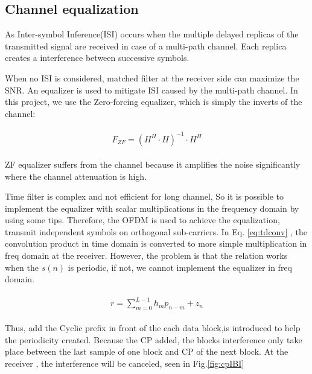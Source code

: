 \documentclass[a4paper]{article}
\begin{document}
	
	\subsection{Channel equalization}
	
	As Inter-symbol Inference(ISI) occurs when the multiple delayed replicas of the transmitted signal are received in case of a multi-path channel. Each replica creates a interference between successive symbols. 
	
	When no ISI is considered, matched filter at the receiver side can maximize the SNR. An equalizer is used to mitigate ISI caused by the multi-path channel. In this project, we use the Zero-forcing equalizer, which is simply the inverts of the channel:
	
	\begin{align} 
		\begin{split}
			F_{ZF} = (H^H \cdot H) ^{-1} \cdot H^H
		\end{split}
		\label{eq:ZF}
	\end{align}
	
	ZF equalizer suffers from the channel because it amplifies the noise significantly where the channel attenuation is high. 
    
  Time filter is complex and not efficient for long channel, So it is possible to implement the equalizer with scalar multiplications in the frequency domain by using some tips.
Therefore, the OFDM is used to achieve the equalization, transmit independent symbols on orthogonal sub-carriers. In Eq. \ref{eq:tdconv} , the convolution product in time domain is converted to more simple multiplication in freq domain at the receiver. However, the problem is that the relation works when the $s(n)$ is periodic, if not, we cannot implement the equalizer in freq domain.

\begin{align} 
		\begin{split}
			r = \sum_{m=0}^{L-1}h_mp_{n-m} + z_n
		\end{split}
		\label{eq:tdconv}
	\end{align}

 Thus, add the Cyclic prefix in front of the each data block,is introduced to help the periodicity created. Because the CP added, the blocks interference only take place between the last sample of one block and CP of the next block. At the receiver , the interference will be canceled, seen in Fig.\ref{fig:cpIBI}
 
\end{document}
